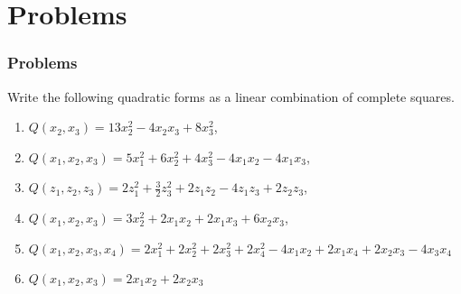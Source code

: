 \section{Problems}
\begin{frame}
    \frametitle{Problems}
    \begin{block}{ Write the following quadratic forms as a linear combination of complete squares.}
        \begin{enumerate}
            \item 
            $Q\left( x_2,x_3 \right)=13x_2^2-4x_2x_3+8x_3^2$,
            \item
            $Q\left( x_1,x_2,x_3 \right)=5x_1^2+6x_2^2+4x_3^2-4x_1x_2-4x_1x_3$,
            \item
            $Q\left( z_1,z_2,z_3 \right)=2z_1^2+\frac{3}{2}z_3^2+2z_1z_2-4z_1z_3+2z_2z_3$,
            \item
            $Q\left( x_1,x_2,x_3 \right)=3x_2^2+2x_1x_2+2x_1x_3+6x_2x_3$,
            \item
            $Q\left( x_1,x_2,x_3,x_4 \right)=2x_1^2+2x_2^2+2x_3^2+2x_4^2-4x_1x_2+2x_1x_4+2x_2x_3-4x_3x_4$
            \item
            $Q\left( x_1,x_2,x_3\right)=2x_1x_2+2x_2x_3$
        \end{enumerate}
    \end{block}
\end{frame}
